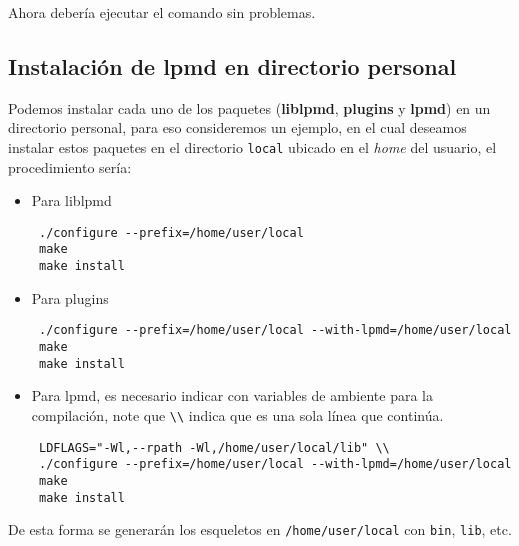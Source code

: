 Ahora deber\'ia ejecutar el comando sin problemas.

\subsection{Instalaci\'on de lpmd en directorio personal}
\label{subsub:personaldir}

Podemos instalar cada uno de los paquetes (\textbf{liblpmd}, \textbf{plugins} y \textbf{lpmd}) en un directorio personal, para eso consideremos un ejemplo, en el cual deseamos instalar estos paquetes en el directorio \verb|local| ubicado en el \textit{home} del usuario, el procedimiento ser\'ia:

\begin{itemize}
 \item Para liblpmd
 \begin{verbatim}
 ./configure --prefix=/home/user/local
 make
 make install
 \end{verbatim}
 \item Para plugins
 \begin{verbatim}
 ./configure --prefix=/home/user/local --with-lpmd=/home/user/local
 make
 make install
 \end{verbatim}
 \item Para lpmd, es necesario indicar con variables de ambiente para la compilaci\'on, note que \verb|\\| indica que es una sola l\'inea que contin\'ua.
 \begin{verbatim}
 LDFLAGS="-Wl,--rpath -Wl,/home/user/local/lib" \\
 ./configure --prefix=/home/user/local --with-lpmd=/home/user/local
 make
 make install
 \end{verbatim}
\end{itemize}

De esta forma se generar\'an los esqueletos en \verb|/home/user/local| con \verb|bin|, \verb|lib|, etc.



% 
% 

